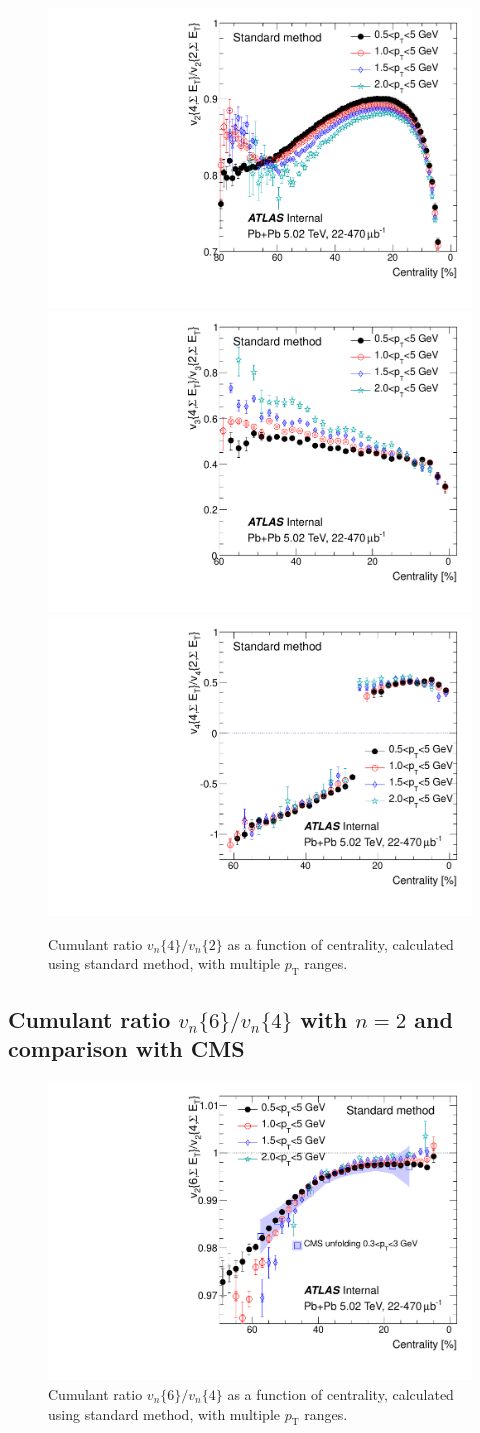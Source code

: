 \begin{figure}[H]
\centering
\includegraphics[width=.32\linewidth]{figs/sec_paper/comp_vn4vn2_har2_Cent.pdf}
\includegraphics[width=.32\linewidth]{figs/sec_paper/comp_vn4vn2_har3_Cent.pdf}
\includegraphics[width=.32\linewidth]{figs/sec_paper/comp_vn4vn2_har4_Cent.pdf}
\caption{Cumulant ratio $v_n\{4\}/v_n\{2\}$ as a function of centrality, calculated using standard method, with multiple $p_\text{T}$ ranges.}
\label{fig:paper_cr42}
\end{figure}

\subsection{Cumulant ratio $v_n\{6\}/v_n\{4\}$ with $n=2$ and comparison with CMS}

\begin{figure}[H]
\centering
\includegraphics[width=.32\linewidth]{figs/sec_paper/comp_vn6vn4_har2_Cent.pdf}
\caption{Cumulant ratio $v_n\{6\}/v_n\{4\}$ as a function of centrality, calculated using standard method, with multiple $p_\text{T}$ ranges.}
\label{fig:paper_cr64}
\end{figure}

